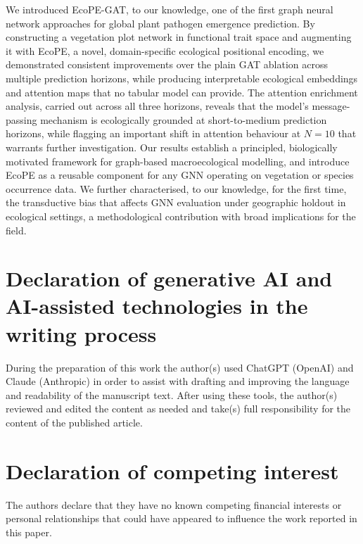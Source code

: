 \documentclass[a4paper,fleqn]{cas-sc}
\begin{document}
We introduced EcoPE-GAT, to our knowledge, one of the first graph neural network approaches for global plant pathogen emergence prediction. By constructing a vegetation plot network in functional trait space and augmenting it with EcoPE, a novel, domain-specific ecological positional encoding, we demonstrated consistent improvements over the plain GAT ablation across multiple prediction horizons, while producing interpretable ecological embeddings and attention maps that no tabular model can provide. The attention enrichment analysis, carried out across all three horizons, reveals that the model's message-passing mechanism is ecologically grounded at short-to-medium prediction horizons, while flagging an important shift in attention behaviour at $N=10$ that warrants further investigation. Our results establish a principled, biologically motivated framework for graph-based macroecological modelling, and introduce EcoPE as a reusable component for any GNN operating on vegetation or species occurrence data. We further characterised, to our knowledge, for the first time, the transductive bias that affects GNN evaluation under geographic holdout in ecological settings, a methodological contribution with broad implications for the field.


\section*{Declaration of generative AI and AI-assisted technologies in the writing process}
During the preparation of this work the author(s) used ChatGPT (OpenAI) and Claude (Anthropic) in order to assist with drafting and improving the language and readability of the manuscript text. After using these tools, the author(s) reviewed and edited the content as needed and take(s) full responsibility for the content of the published article.

\printcredits

\section*{Declaration of competing interest}
The authors declare that they have no known competing financial interests or personal relationships that could have appeared to influence the work reported in this paper. 
\end{document}
